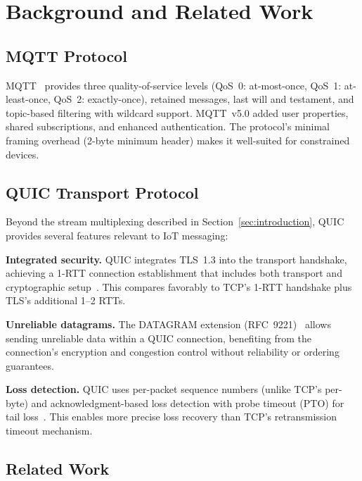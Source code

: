 \section{Background and Related Work}
\label{sec:background}

\subsection{MQTT Protocol}

MQTT~\cite{mqtt-v5-spec} provides three quality-of-service levels (QoS~0: at-most-once, QoS~1: at-least-once, QoS~2: exactly-once), retained messages, last will and testament, and topic-based filtering with wildcard support. MQTT~v5.0 added user properties, shared subscriptions, and enhanced authentication. The protocol's minimal framing overhead (2-byte minimum header) makes it well-suited for constrained devices.

\subsection{QUIC Transport Protocol}

Beyond the stream multiplexing described in Section~\ref{sec:introduction}, QUIC~\cite{rfc9000} provides several features relevant to IoT messaging:

\textbf{Integrated security.} QUIC integrates TLS~1.3 into the transport handshake, achieving a 1-RTT connection establishment that includes both transport and cryptographic setup~\cite{rfc9001}. This compares favorably to TCP's 1-RTT handshake plus TLS's additional 1--2 RTTs.

\textbf{Unreliable datagrams.} The DATAGRAM extension (RFC~9221)~\cite{rfc9221} allows sending unreliable data within a QUIC connection, benefiting from the connection's encryption and congestion control without reliability or ordering guarantees.

\textbf{Loss detection.} QUIC uses per-packet sequence numbers (unlike TCP's per-byte) and acknowledgment-based loss detection with probe timeout (PTO) for tail loss~\cite{rfc9002}. This enables more precise loss recovery than TCP's retransmission timeout mechanism.

\subsection{Related Work}

